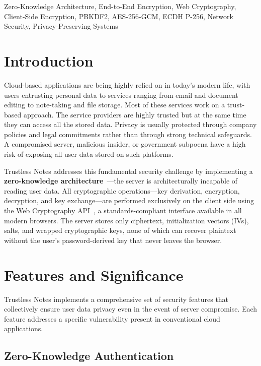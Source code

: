 \documentclass[conference]{IEEEtran}
\begin{document}
\begin{IEEEkeywords}
Zero-Knowledge Architecture, End-to-End Encryption, Web Cryptography, Client-Side Encryption, PBKDF2, AES-256-GCM, ECDH P-256, Network Security, Privacy-Preserving Systems
\end{IEEEkeywords}

\section{Introduction}

Cloud-based applications are being highly relied on in today's modern life, with users entrusting personal data to services ranging from email and document editing to note-taking and file storage. Most of these services work on a trust-based approach. The service providers are highly trusted but at the same time they can access all the stored data. Privacy is usually protected through company policies and legal commitments rather than through strong technical safeguards. A compromised server, malicious insider, or government subpoena have a high risk of exposing all user data stored on such platforms.

Trustless Notes addresses this fundamental security challenge by implementing a \textbf{zero-knowledge architecture}~\cite{ref14,ref20}---the server is architecturally incapable of reading user data. All cryptographic operations---key derivation, encryption, decryption, and key exchange---are performed exclusively on the client side using the Web Cryptography API~\cite{ref1}, a standards-compliant interface available in all modern browsers. The server stores only ciphertext, initialization vectors (IVs), salts, and wrapped cryptographic keys, none of which can recover plaintext without the user's password-derived key that never leaves the browser.

\section{Features and Significance}

Trustless Notes implements a comprehensive set of security features that collectively ensure user data privacy even in the event of server compromise. Each feature addresses a specific vulnerability present in conventional cloud applications.

\subsection{Zero-Knowledge Authentication}
\end{document}
